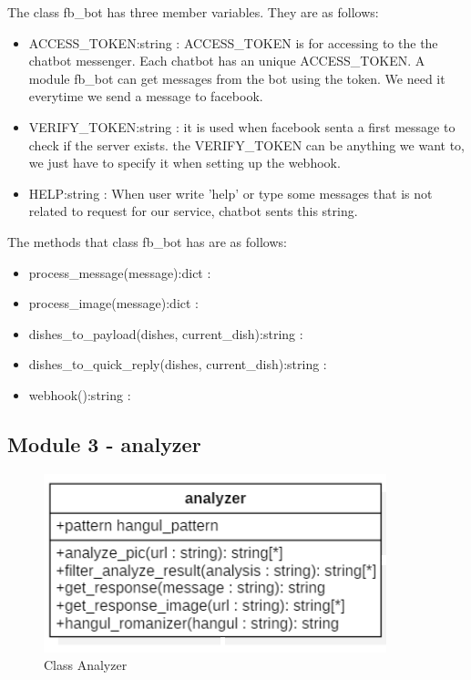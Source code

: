 The class fb\_bot has three member variables. They are as follows:

\begin{itemize}
\item ACCESS\_TOKEN:string : ACCESS\_TOKEN is for accessing to the the chatbot messenger. Each chatbot has an unique ACCESS\_TOKEN. A module fb\_bot can get messages from the bot using the token. We need it everytime we send a message to facebook. 
\item VERIFY\_TOKEN:string : it is used when facebook senta a first message to check if the server exists. the VERIFY\_TOKEN can be anything we want to, we just have to specify it when setting up the webhook.
\item HELP:string : When user write 'help' or type some messages that is not related to request for our service, chatbot sents this string.
\end{itemize} 

The methods that class fb\_bot has are as follows:

\begin{itemize}
\item process\_message(message):dict :
\item process\_image(message):dict :
\item dishes\_to\_payload(dishes, current\_dish):string :
\item dishes\_to\_quick\_reply(dishes, current\_dish):string :
\item webhook():string :
\end{itemize} 

\FloatBarrier


\subsection{Module 3 - analyzer}



\begin{figure}[htbp]
\centerline{\includegraphics[width=\linewidth]{./pictures/class_analyzer}}
\caption{Class Analyzer}
\label{fig:class_analyzer}
\end{figure}
\FloatBarrier

